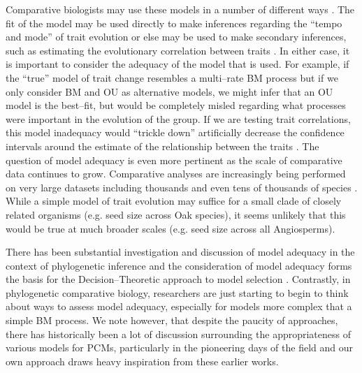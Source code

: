 \documentclass[a4paper,12pt]{article}
\begin{document}
Comparative biologists may use these models in a number of different ways \citep{Freckleton2011, PennellHarmon}. The fit of the model may be used directly to make inferences regarding the ``tempo and mode'' of trait evolution \citep{HansenMartins1996, Mooers1999, Harmon2010} or else may be used to make secondary inferences, such as estimating the evolutionary correlation between traits \citep{Felsenstein1985}. In either case, it is important to consider the adequacy of the model that is used. For example, if the ``true'' model of trait change resembles a multi--rate BM process \citep{Omeara2006, Thomas2006, Eastman2011} but if we only consider BM and OU as alternative models, we might infer that an OU model is the best--fit, but would be completely misled regarding what processes were important in the evolution of the group. If we are testing trait correlations, this model inadequacy would ``trickle down'' artificially decrease the confidence intervals around the estimate of the relationship between the traits \citep{Rohlf2006}. The question of model adequacy is even more pertinent as the scale of comparative data continues to grow. Comparative analyses are increasingly being performed on very large datasets including thousands and even tens of thousands of species \citep[e.g.][]{Coopermammal, Jetz2012, Rabosky2013, Cornwell2013, PyronBurbrink2013, Zanne2013}. While a simple model of trait evolution may suffice for a small clade of closely related organisms (e.g. seed size across Oak species), it seems unlikely that this would be true at much broader scales (e.g. seed size across all Angiosperms). 

There has been substantial investigation and discussion of model adequacy in the context of phylogenetic inference \citep[e.g.][]{GautLewis1995, SullivanSwofford, Goldman, HuelsenbeckBull1996, SandersonKim, Bollback2002, Ripplinger2010, Lewis2013, Brown2013} and the consideration of model adequacy forms the basis for the Decision--Theoretic approach to model selection \citep{Minin2003, SullivanJoyce2005}. Contrastly, in phylogenetic comparative biology, researchers are just starting to begin to think about ways to assess model adequacy, especially for models more complex that a simple BM process. We note however, that despite the paucity of approaches, there has historically been a lot of discussion surrounding the appropriateness of various models for PCMs, particularly in the pioneering days of the field \citep[e.g.][]{Felsenstein1985, Felsenstein1988, HarveyPagel1991, Garland1992, Pagel1993, Diaz1996, Price1997, GarlandIves2000, Hansen2012} and our own approach draws heavy inspiration from these earlier works.
\end{document}
